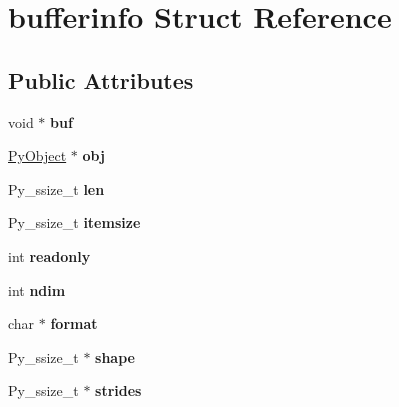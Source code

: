 \hypertarget{structbufferinfo}{}\section{bufferinfo Struct Reference}
\label{structbufferinfo}
\subsection*{Public Attributes}
\begin{DoxyCompactItemize}
\item 
void $\ast$ {\bfseries buf}\hypertarget{structbufferinfo_aa1612327c7d07341a8e7977268414928}{}\label{structbufferinfo_aa1612327c7d07341a8e7977268414928}

\item 
\hyperlink{struct__object}{Py\+Object} $\ast$ {\bfseries obj}\hypertarget{structbufferinfo_a0287133b4101fc4c9a99234d50f33d26}{}\label{structbufferinfo_a0287133b4101fc4c9a99234d50f33d26}

\item 
Py\+\_\+ssize\+\_\+t {\bfseries len}\hypertarget{structbufferinfo_af68796aac75561d6da012f5f1615981e}{}\label{structbufferinfo_af68796aac75561d6da012f5f1615981e}

\item 
Py\+\_\+ssize\+\_\+t {\bfseries itemsize}\hypertarget{structbufferinfo_aa0de675754767fa69b18b75a579d9edc}{}\label{structbufferinfo_aa0de675754767fa69b18b75a579d9edc}

\item 
int {\bfseries readonly}\hypertarget{structbufferinfo_ac642ba143cd5883184a5000fde3c0273}{}\label{structbufferinfo_ac642ba143cd5883184a5000fde3c0273}

\item 
int {\bfseries ndim}\hypertarget{structbufferinfo_a6286d6ec73743f70b1025554fba51724}{}\label{structbufferinfo_a6286d6ec73743f70b1025554fba51724}

\item 
char $\ast$ {\bfseries format}\hypertarget{structbufferinfo_abd230131599b8e4fbab14cc92bfb8751}{}\label{structbufferinfo_abd230131599b8e4fbab14cc92bfb8751}

\item 
Py\+\_\+ssize\+\_\+t $\ast$ {\bfseries shape}\hypertarget{structbufferinfo_aef70e346a1de6bfcfcc18b601c55fb36}{}\label{structbufferinfo_aef70e346a1de6bfcfcc18b601c55fb36}

\item 
Py\+\_\+ssize\+\_\+t $\ast$ {\bfseries strides}\hypertarget{structbufferinfo_a8c29b8c8440faab99793810b5ba12971}{}\label{structbufferinfo_a8c29b8c8440faab99793810b5ba12971}


\end{DoxyCompactItemize}
